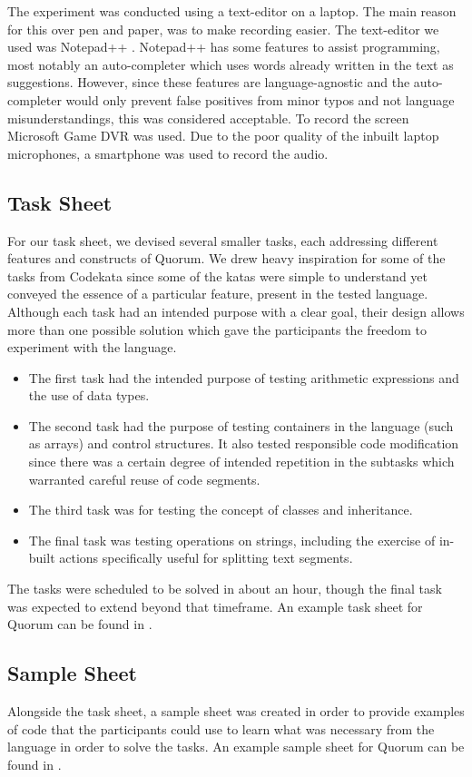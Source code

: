 \documentclass[preprint,10pt]{sigplanconf}
\begin{document}
The experiment was conducted using a text-editor on a laptop.
The main reason for this over pen and paper, was to make recording easier.
The text-editor we used was Notepad++ \cite{Notepad}.
Notepad++ has some features to assist programming, most notably an auto-completer which uses words already written in the text as suggestions.
However, since these features are language-agnostic and the auto-completer would only prevent false positives from minor typos and not language misunderstandings, this was considered acceptable.
To record the screen Microsoft Game DVR was used.
Due to the poor quality of the inbuilt laptop microphones, a smartphone was used to record the audio.

\subsection{Task Sheet}
For our task sheet, we devised several smaller tasks, each addressing different features and constructs of Quorum. We drew heavy inspiration for some of the tasks from Codekata \cite{Codekata} since some of the katas were simple to understand yet conveyed the essence of a particular feature, present in the tested language.
Although each task had an intended purpose with a clear goal, their design allows more than one possible solution which gave the participants the freedom to experiment with the language.
\begin{itemize}
\item The first task had the intended purpose of testing arithmetic expressions and the use of data types.
\item The second task had the purpose of testing containers in the language (such as arrays) and control structures.
It also tested responsible code modification since there was a certain degree of intended repetition in the subtasks which warranted careful reuse of code segments.%
\item The third task was for testing the concept of classes and inheritance.
\item The final task was testing operations on strings, including the exercise of in-built actions specifically useful for splitting text segments.
\end{itemize}
The tasks were scheduled to be solved in about an hour, though the final task was expected to extend beyond that timeframe.
An example task sheet for Quorum can be found in \cite{thesis}.

\subsection{Sample Sheet}
Alongside the task sheet, a sample sheet was created in order to provide examples of code that the participants could use to learn what was necessary from the language in order to solve the tasks. 
An example sample sheet for Quorum can be found in \cite{thesis}.
\end{document}
